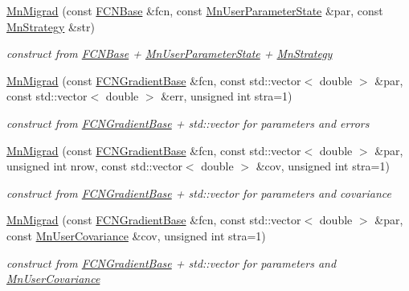 \begin{DoxyCompactItemize}
\mbox{\hyperlink{classROOT_1_1Minuit2_1_1MnMigrad_a6ee8b2dacc7c6255fdae62f851acaa48}{Mn\+Migrad}} (const \mbox{\hyperlink{classROOT_1_1Minuit2_1_1FCNBase}{F\+C\+N\+Base}} \&fcn, const \mbox{\hyperlink{classROOT_1_1Minuit2_1_1MnUserParameterState}{Mn\+User\+Parameter\+State}} \&par, const \mbox{\hyperlink{classROOT_1_1Minuit2_1_1MnStrategy}{Mn\+Strategy}} \&str)
\begin{DoxyCompactList}\small\item\em construct from \mbox{\hyperlink{classROOT_1_1Minuit2_1_1FCNBase}{F\+C\+N\+Base}} + \mbox{\hyperlink{classROOT_1_1Minuit2_1_1MnUserParameterState}{Mn\+User\+Parameter\+State}} + \mbox{\hyperlink{classROOT_1_1Minuit2_1_1MnStrategy}{Mn\+Strategy}} \end{DoxyCompactList}\item 
\mbox{\hyperlink{classROOT_1_1Minuit2_1_1MnMigrad_a2c295cfd762493e53e71d2cd004c3061}{Mn\+Migrad}} (const \mbox{\hyperlink{classROOT_1_1Minuit2_1_1FCNGradientBase}{F\+C\+N\+Gradient\+Base}} \&fcn, const std\+::vector$<$ double $>$ \&par, const std\+::vector$<$ double $>$ \&err, unsigned int stra=1)
\begin{DoxyCompactList}\small\item\em construct from \mbox{\hyperlink{classROOT_1_1Minuit2_1_1FCNGradientBase}{F\+C\+N\+Gradient\+Base}} + std\+::vector for parameters and errors \end{DoxyCompactList}\item 
\mbox{\hyperlink{classROOT_1_1Minuit2_1_1MnMigrad_a08924727b4a6e4fb5bd15816a88e5878}{Mn\+Migrad}} (const \mbox{\hyperlink{classROOT_1_1Minuit2_1_1FCNGradientBase}{F\+C\+N\+Gradient\+Base}} \&fcn, const std\+::vector$<$ double $>$ \&par, unsigned int nrow, const std\+::vector$<$ double $>$ \&cov, unsigned int stra=1)
\begin{DoxyCompactList}\small\item\em construct from \mbox{\hyperlink{classROOT_1_1Minuit2_1_1FCNGradientBase}{F\+C\+N\+Gradient\+Base}} + std\+::vector for parameters and covariance \end{DoxyCompactList}\item 
\mbox{\hyperlink{classROOT_1_1Minuit2_1_1MnMigrad_ae34b6d666b4a960bd1b382d5e574fa69}{Mn\+Migrad}} (const \mbox{\hyperlink{classROOT_1_1Minuit2_1_1FCNGradientBase}{F\+C\+N\+Gradient\+Base}} \&fcn, const std\+::vector$<$ double $>$ \&par, const \mbox{\hyperlink{classROOT_1_1Minuit2_1_1MnUserCovariance}{Mn\+User\+Covariance}} \&cov, unsigned int stra=1)
\begin{DoxyCompactList}\small\item\em construct from \mbox{\hyperlink{classROOT_1_1Minuit2_1_1FCNGradientBase}{F\+C\+N\+Gradient\+Base}} + std\+::vector for parameters and \mbox{\hyperlink{classROOT_1_1Minuit2_1_1MnUserCovariance}{Mn\+User\+Covariance}} \end{DoxyCompactList}\item 

\end{DoxyCompactItemize}
